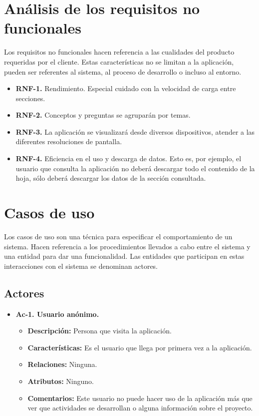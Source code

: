 \section{Análisis de los requisitos no funcionales}

Los requisitos no funcionales hacen referencia a las cualidades del producto requeridas por el cliente. Estas características no se limitan a la aplicación, pueden ser referentes al sistema, al proceso de desarrollo o incluso al entorno.

\begin{itemize}
  \item \textbf{RNF-1.} Rendimiento. Especial cuidado con la velocidad de carga entre secciones.
  \item \textbf{RNF-2.} Conceptos y preguntas se agruparán por temas.
  \item \textbf{RNF-3.} La aplicación se visualizará desde diversos dispositivos, atender a las diferentes resoluciones de pantalla.
  \item \textbf{RNF-4.} Eficiencia en el uso y descarga de datos. Esto es, por ejemplo, el usuario que consulta la aplicación no deberá descargar todo el contenido de la hoja, sólo deberá descargar los datos de la sección consultada.
\end{itemize}


\section{Casos de uso}
	Los casos de uso son una técnica para especificar el comportamiento de un sistema. Hacen referencia a los procedimientos llevados a cabo entre el sistema y una entidad para dar una funcionalidad. Las entidades que participan en estas interacciones con el sistema se denominan actores.

\subsection{Actores}

	
\begin{itemize}
  \item \textbf{Ac-1. Usuario anónimo.}
  \begin{itemize}
   \item \textbf{Descripción:} Persona que visita la aplicación.
   \item \textbf{Características:} Es el usuario que llega por primera vez a la aplicación.
   \item \textbf{Relaciones:} Ninguna.
   \item \textbf{Atributos:} Ninguno.
   \item \textbf{Comentarios:} Este usuario no puede hacer uso de la aplicación más que ver que actividades se desarrollan o alguna información sobre el proyecto.
  \end{itemize}
\end{itemize}

